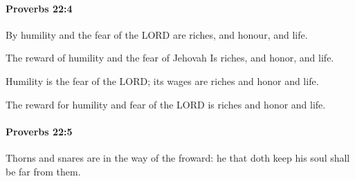 		\paragraph{Proverbs 22:4} %
			\label{PROVERBS-22-4}

			By humility and the fear of the LORD are riches, and honour, and life.

			\begin{versebox}
					\item[BHS] 
					\item[ASV] The reward of humility and the fear of Jehovah Is riches, and honor, and life.
					\item[NIV] Humility is the fear of the LORD; its wages are riches and honor and life.
					\item[NRSV] The reward for humility and fear of the LORD is riches and honor and life.
			\end{versebox}

		\paragraph{Proverbs 22:5} %
			\label{PROVERBS-22-5}

			Thorns and snares are in the way of the froward: he that doth keep his soul shall be far from them.

